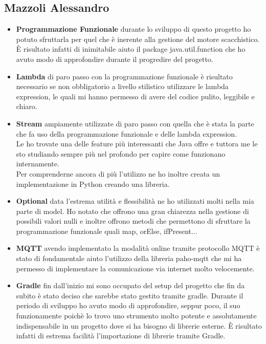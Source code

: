 \documentclass[a4paper,12pt]{report}
\begin{document}
\subsection{Mazzoli Alessandro}
\begin{itemize}

\item \textbf{Programmazione Funzionale} durante lo sviluppo di questo progetto ho potuto sfruttarla per quel che è inerente alla gestione del motore scacchistico. 
È risultato infatti di inimitabile aiuto il package java.util.function che ho avuto modo di approfondire durante il progredire del progetto.

\item \textbf{Lambda} di paro passo con la programmazione funzionale è risultato necessario se non obbligatorio a livello stilistico utilizzare le lambda expression, le quali mi hanno permesso di avere del codice pulito, leggibile e chiaro.

\item \textbf{Stream} ampiamente utilizzate di paro passo con quella che è stata la parte che fa uso della programmazione funzionale e delle lambda expression.
\\
Le ho trovate una delle feature più interessanti che Java offre e tuttora me le sto studiando sempre più nel profondo per capire come funzionano internamente.
\\
Per comprenderne ancora di più l'utilizzo ne ho inoltre creata un implementazione in Python creando una libreria.

\item \textbf{Optional} data l'estrema utilità e flessibilità ne ho utilizzati molti nella mia parte di model. Ho notato che offrono una gran chiarezza nella gestione di possibili valori nulli e inoltre offrono metodi che permettono di sfruttare la programmazione funzionale quali map, orElse, ifPresent...

\item \textbf{MQTT} avendo implementato la modalità online tramite protocollo MQTT è stato di fondamentale aiuto l'utilizzo della libreria paho-mqtt che mi ha permesso di implementare la comunicazione via internet molto velocemente.

\item \textbf{Gradle} fin dall'inizio mi sono occupato del setup del progetto che fin da subito è stato deciso che sarebbe stato gestito tramite gradle. Durante il periodo di sviluppo ho avuto modo di approfondire, seppur poco, il suo funzionamente poichè lo trovo uno strumento molto potente e assolutamente indispensabile in un progetto dove si ha bisogno di librerie esterne. È risultato infatti di estrema facilità l'importazione di librerie tramite Gradle.

\end{itemize}
\end{document}
